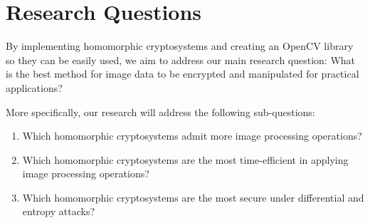 \section{Research Questions}

By implementing homomorphic cryptosystems and creating an OpenCV library so they can be easily used, we aim to address our main research question: What is the best method for image data to be encrypted and manipulated for practical applications?

More specifically, our research will address the following sub-questions:
\begin{enumerate}
	\item Which homomorphic cryptosystems admit more image processing operations?
	\item Which homomorphic cryptosystems are the most time-efficient in applying image processing operations?
	\item Which homomorphic cryptosystems are the most secure under differential and entropy attacks?
\end{enumerate}
